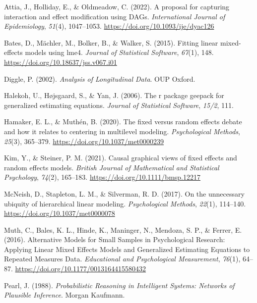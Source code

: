 \documentclass[
  12pt,
  a4paper,
]{article}
\newlength{\cslhangindent}
\newenvironment{CSLReferences}[2] %
 {\begin{list}{}{%
  \setlength{\itemindent}{0pt}
  \setlength{\leftmargin}{0pt}
  \setlength{\parsep}{0pt}
  \ifodd #1
   \setlength{\leftmargin}{\cslhangindent}
   \setlength{\itemindent}{-1\cslhangindent}
  \fi
  \setlength{\itemsep}{#2\baselineskip}}}
 {\end{list}}
\begin{document}
\label{refs}
\begin{CSLReferences}{1}{0}
Attia, J., Holliday, E., \& Oldmeadow, C. (2022). A proposal for
capturing interaction and effect modification using DAGs.
\emph{International Journal of Epidemiology}, \emph{51}(4), 1047--1053.
\url{https://doi.org/10.1093/ije/dyac126}

Bates, D., Mächler, M., Bolker, B., \& Walker, S. (2015). Fitting linear
mixed-effects models using {lme4}. \emph{Journal of Statistical
Software}, \emph{67}(1), 148.
\url{https://doi.org/10.18637/jss.v067.i01}

Diggle, P. (2002). \emph{Analysis of Longitudinal Data}. OUP Oxford.

Halekoh, U., Højsgaard, S., \& Yan, J. (2006). The r package geepack for
generalized estimating equations. \emph{Journal of Statistical
Software}, \emph{15/2}, 111.

Hamaker, E. L., \& Muthén, B. (2020). The fixed versus random effects
debate and how it relates to centering in multilevel modeling.
\emph{Psychological Methods}, \emph{25}(3), 365--379.
\url{https://doi.org/10.1037/met0000239}

Kim, Y., \& Steiner, P. M. (2021). Causal graphical views of fixed
effects and random effects models. \emph{British Journal of Mathematical
and Statistical Psychology}, \emph{74}(2), 165--183.
\url{https://doi.org/10.1111/bmsp.12217}

McNeish, D., Stapleton, L. M., \& Silverman, R. D. (2017). On the
unnecessary ubiquity of hierarchical linear modeling.
\emph{Psychological Methods}, \emph{22}(1), 114--140.
\url{https://doi.org/10.1037/met0000078}

Muth, C., Bales, K. L., Hinde, K., Maninger, N., Mendoza, S. P., \&
Ferrer, E. (2016). Alternative Models for Small Samples in Psychological
Research: Applying Linear Mixed Effects Models and Generalized
Estimating Equations to Repeated Measures Data. \emph{Educational and
Psychological Measurement}, \emph{76}(1), 64--87.
\url{https://doi.org/10.1177/0013164415580432}

Pearl, J. (1988). \emph{Probabilistic Reasoning in Intelligent Systems:
Networks of Plausible Inference}. Morgan Kaufmann.


\end{CSLReferences}
\end{document}
